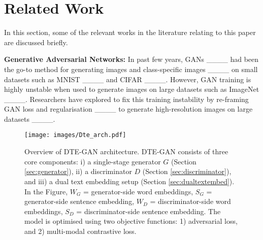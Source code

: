 \section{Related Work}
In this section, some of the relevant works in the literature relating to this paper are discussed briefly.

\noindent\textbf{Generative Adversarial Networks:}  In past few years, GANs ____ had been the go-to method for generating images and class-specific images ____ on small datasets such as MNIST ____ and CIFAR ____. However, GAN training is highly unstable when used to generate images on large datasets such as ImageNet ____. Researchers have explored to fix this training instability by re-framing  GAN loss and regularisation ____ to generate high-resolution images on large datasets ____. 

\begin{figure*}[t]
    \centering
    \texttt{[image: images/Dte\_arch.pdf]}
    \vspace{-0.2cm}
    \caption{Overview of DTE-GAN architecture. DTE-GAN consists of three core components: i) a single-stage generator $G$ (Section \ref{sec:generator}), ii) a discriminator $D$ (Section \ref{sec:discriminator}), and iii) a dual text embedding setup (Section \ref{sec:dualtextembed}). In the Figure, $W_G$ = generator-side word embeddings, $S_G$ = generator-side sentence embedding, $W_D$ = discriminator-side word embeddings, $S_D$ = discriminator-side sentence embedding. The model is optimised using two objective functions: 1) adversarial loss, and 2) multi-modal contrastive loss.}
    \label{fig:modelarch}
\end{figure*}

